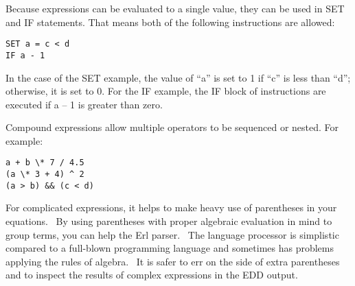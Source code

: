 Because expressions can be evaluated to a single value, they can be used in SET and IF statements. That means both of the following instructions are allowed:

\begin{lstlisting}
SET a = c < d
IF a - 1
\end{lstlisting}

In the case of the SET example, the value of ``a'' is set to 1 if ``c'' is less than ``d''; otherwise, it is set to 0. For the IF example, the IF block of instructions are executed if a -- 1 is greater than zero.

Compound expressions allow multiple operators to be sequenced or nested. For example:

\begin{lstlisting}
a + b \* 7 / 4.5
(a \* 3 + 4) ^ 2
(a > b) && (c < d)
\end{lstlisting}

For complicated expressions, it helps to make heavy use of parentheses in your equations.~ By using parentheses with proper algebraic evaluation in mind to group terms, you can help the Erl parser.~ The language processor is simplistic compared to a full-blown programming language and sometimes has problems applying the rules of algebra.~ It is safer to err on the side of extra parentheses and to inspect the results of complex expressions in the EDD output.
